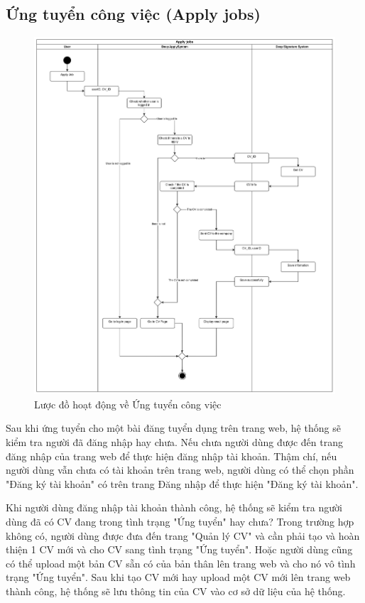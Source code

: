 \subsection{Ứng tuyển công việc (Apply jobs)}

\begin{figure}[H]

	\centering
    \includegraphics[scale=0.08]{img/Apply_jobs_Activity.png}
    \caption{Lược đồ hoạt động về Ứng tuyển công việc}
\end{figure}

Sau khi ứng tuyển cho một bài đăng tuyển dụng trên trang web, hệ thống sẽ kiểm tra người đã đăng nhập hay chưa. Nếu chưa người dùng được đến trang đăng nhập của trang web để thực hiện đăng nhập tài khoản. Thậm chí, nếu người dùng vẫn chưa có tài khoản trên trang web, người dùng có thể chọn phần "Đăng ký tài khoản" có trên trang Đăng nhập để thực hiện "Đăng ký tài khoản". 

Khi người dùng đăng nhập tài khoản thành công, hệ thống sẽ kiểm tra người dùng đã có CV đang trong tình trạng "Ứng tuyển" hay chưa? Trong trường hợp không có, người dùng được đưa đến trang "Quản lý CV" và cần phải tạo và hoàn thiện 1 CV mới và cho CV sang tình trạng "Ứng tuyển". Hoặc người dùng cũng có thể upload một bản CV sẵn có của bản thân lên trang web và cho nó vô tình trạng "Ứng tuyển". Sau khi tạo CV mới hay upload một CV mới lên trang web thành công, hệ thống sẽ lưu thông tin của CV vào cơ sở dữ liệu của hệ thống. 

